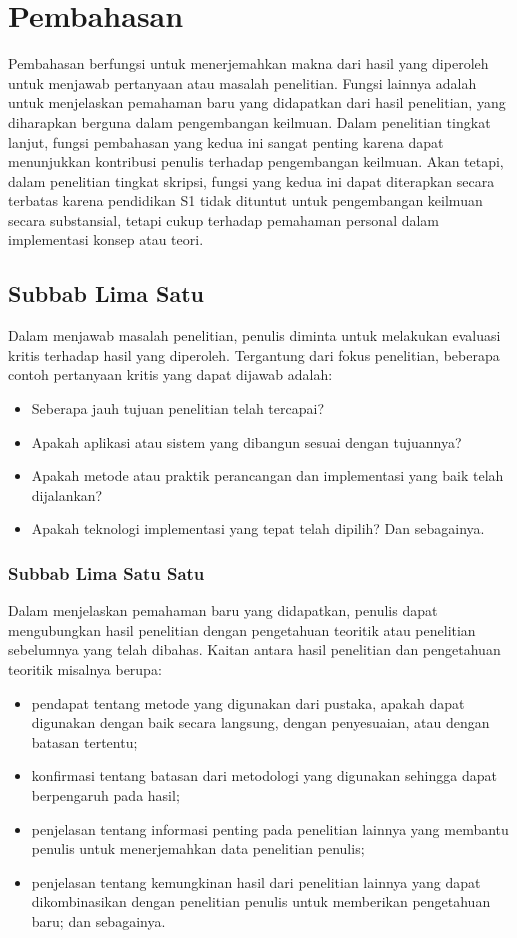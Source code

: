 \newpage
\chapter{Pembahasan}

Pembahasan berfungsi untuk menerjemahkan makna dari hasil yang diperoleh untuk menjawab pertanyaan atau masalah penelitian. Fungsi lainnya adalah untuk menjelaskan pemahaman baru yang didapatkan dari hasil penelitian, yang diharapkan berguna dalam pengembangan keilmuan. Dalam penelitian tingkat lanjut, fungsi pembahasan yang kedua ini sangat penting karena dapat menunjukkan kontribusi penulis terhadap pengembangan keilmuan. Akan tetapi, dalam penelitian tingkat skripsi, fungsi yang kedua ini dapat diterapkan secara terbatas karena pendidikan S1 tidak dituntut untuk pengembangan keilmuan secara substansial, tetapi cukup terhadap pemahaman personal dalam implementasi konsep atau teori. 

\section{Subbab Lima Satu}

Dalam menjawab masalah penelitian, penulis diminta untuk melakukan evaluasi kritis terhadap hasil yang diperoleh. Tergantung dari fokus penelitian, beberapa contoh pertanyaan kritis yang dapat dijawab adalah:
\begin{itemize}
  \item Seberapa jauh tujuan penelitian telah tercapai?
  \item Apakah aplikasi atau sistem yang dibangun sesuai dengan tujuannya?
  \item Apakah metode atau praktik perancangan dan implementasi yang baik telah dijalankan?
  \item Apakah teknologi implementasi yang tepat telah dipilih? Dan sebagainya. 
\end{itemize} 

\subsection{Subbab Lima Satu Satu}

Dalam menjelaskan pemahaman baru yang didapatkan, penulis dapat mengubungkan hasil penelitian dengan pengetahuan teoritik atau penelitian sebelumnya yang telah dibahas. Kaitan antara hasil penelitian dan pengetahuan teoritik misalnya berupa:
\begin{itemize}
  \item pendapat tentang metode yang digunakan dari pustaka, apakah dapat digunakan dengan baik secara langsung, dengan penyesuaian, atau dengan batasan tertentu;
  \item konfirmasi tentang batasan dari metodologi yang digunakan sehingga dapat berpengaruh pada hasil;
  \item penjelasan tentang informasi penting pada penelitian lainnya yang membantu penulis untuk menerjemahkan data penelitian penulis;
  \item penjelasan tentang kemungkinan hasil dari penelitian lainnya yang dapat dikombinasikan dengan penelitian penulis untuk memberikan pengetahuan baru; dan sebagainya. 
\end{itemize}

